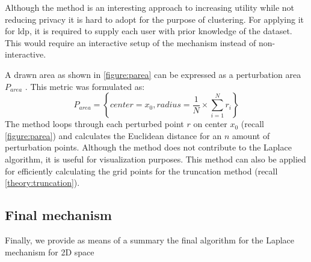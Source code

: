 Although the method is an interesting approach to increasing utility while not reducing privacy it is hard to adopt for the purpose of clustering.
For applying it for \gls{ldp}, it is required to supply each user with prior knowledge of the dataset.
This would require an interactive setup of the mechanism instead of non-interactive. \newline

A drawn area as shown in \ref{figure:parea} can be expressed as a perturbation area $P_{area}$ \citep{yan_perturb_2022}.
This metric was formulated as:
\begin{equation}
  P_{area}=\left\{ center = x_{0},radius = \frac{1}{N}\times \sum _{i=1}^{N}r_{i}\right\}
\end{equation}
The method loops through each perturbed point $r$ on center $x_0$ (recall \ref{figure:parea}) and calculates the Euclidean distance for an $n$ amount of perturbation points.
Although the method does not contribute to the Laplace algorithm, it is useful for visualization purposes.
This method can also be applied for efficiently calculating the grid points for the truncation method (recall \ref{theory:truncation}).
\newpage
\subsection{Final mechanism}
Finally, we provide as means of a summary the final algorithm for the Laplace mechanism for 2D space

\newpage